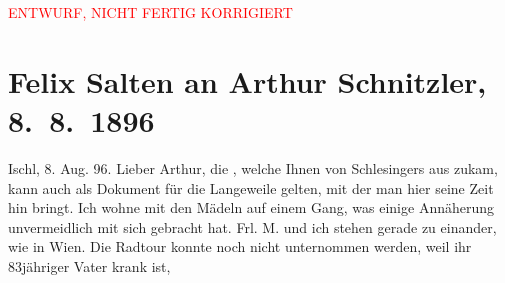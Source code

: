 
\begin{center}
            \textcolor{red}{ENTWURF, NICHT FERTIG KORRIGIERT}
                      \end{center}
            
         
         \renewcommand{\erwaehntePersonen}{Personen: Richard Beer-Hofmann, Paula Beer-Hofmann, Paul Goldmann, Moriz Metzl, Friedrich Mitterwurzer, Wilhelmine Mitterwurzer, Ottilie Salten, Franziska Schlesinger, Emil Schlesinger}
         \renewcommand{\erwaehnteOrte}{Orte: Bad Aussee, Bad Ischl, Skodsborg, Wien}
         \renewcommand{\erwaehnteWerke}{Werke: ?? [Einakter], Anatol, Das Märchen. Schauspiel in drei Aufzügen, Herodes und Mariamne. Eine Tragödie in fünf Aufzügen, Judith. Eine Tragödie in fünf Aufzügen}
               \section[Felix Salten an Arthur Schnitzler, 8. 8. 1896]{ Felix Salten an Arthur Schnitzler, 8. 8. 1896}\nopagebreak{}\rehead{ }\begin{ledgroupsized}[t]{13cm}\normalsize\beginnumbering \toendnotes[C]{\smallbreak\pagebreak[2]} 
\toendnotes[C]{\smallbreak}\pstart
           \raggedleft{}{\pb}Ischl, 8. Aug. 96.\pend
           \pstart
           Lieber Arthur, die \label{K_L03178-112v}\label{K_L03178-112h}, welche Ihnen von Schlesingers aus zukam, kann auch als Dokument für die Langeweile gelten,
               mit der man hier seine Zeit hin bringt. Ich wohne mit den Mädeln auf einem Gang, was
               einige Annäherung unvermeidlich mit sich gebracht hat. Frl. M. und ich stehen gerade zu einander, wie in Wien. Die Radtour konnte noch nicht unternommen werden, weil ihr
               83jähriger Vater krank ist,

\end{ledgroupsized}
